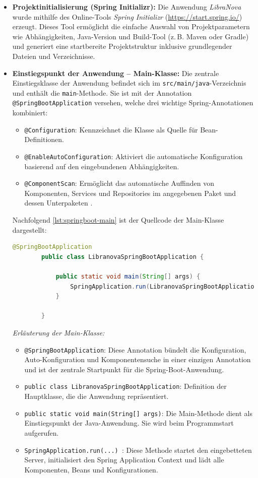 \begin{itemize}
	\item \textbf{Projektinitialisierung (Spring Initializr):} Die Anwendung \textit{LibraNova} wurde mithilfe des Online-Tools \textit{Spring Initializr} (\url{https://start.spring.io/}) erzeugt. Dieses Tool ermöglicht die einfache Auswahl von Projektparametern wie Abhängigkeiten, Java-Version und Build-Tool (z.\,B. Maven oder Gradle) und generiert eine startbereite Projektstruktur inklusive grundlegender Dateien und Verzeichnisse.
	
	\item \textbf{Einstiegspunkt der Anwendung – Main-Klasse:} Die zentrale Einstiegsklasse der Anwendung befindet sich im \texttt{src/main/java}-Verzeichnis und enthält die \texttt{main}-Methode. Sie ist mit der Annotation \texttt{@SpringBootApplication} versehen, welche drei wichtige Spring-Annotationen kombiniert:
	\begin{itemize}
		\item \texttt{@Configuration}: Kennzeichnet die Klasse als Quelle für Bean-Definitionen.
		\item \texttt{@EnableAutoConfiguration}: Aktiviert die automatische Konfiguration basierend auf den eingebundenen Abhängigkeiten.
		\item \texttt{@ComponentScan}: Ermöglicht das automatische Auffinden von Komponenten, Services und Repositories im angegebenen Paket und dessen Unterpaketen \cite{SPRINGBOOAPP2025}.
	\end{itemize}
	
	Nachfolgend \ref{lst:springboot-main} ist der Quellcode der Main-Klasse dargestellt:
	
	\begin{lstlisting}[language=Java, caption=Einstiegspunkt der Spring Boot Anwendung, label=lst:springboot-main, breaklines=true]
		@SpringBootApplication
		public class LibranovaSpringBootApplication {
			
			public static void main(String[] args) {
				SpringApplication.run(LibranovaSpringBootApplication.class, args);
			}
			
		}
	\end{lstlisting}

  \noindent \textit{Erläuterung der Main-Klasse:}
  \begin{itemize}
  	\item \texttt{@SpringBootApplication}: Diese Annotation bündelt die Konfiguration, Auto-Konfiguration und Komponentensuche in einer einzigen Annotation und ist der zentrale Startpunkt für die Spring-Boot-Anwendung.
  	\item \texttt{public class LibranovaSpringBootApplication}: Definition der Hauptklasse, die die Anwendung repräsentiert.
  	\item \texttt{public static void main(String[] args)}: Die Main-Methode dient als Einstiegspunkt der Java-Anwendung. Sie wird beim Programmstart aufgerufen.
  	\item \texttt{SpringApplication.run(...) }: Diese Methode startet den eingebetteten Server, initialisiert den Spring Application Context und lädt alle Komponenten, Beans und Konfigurationen.
  \end{itemize}


\end{itemize}
